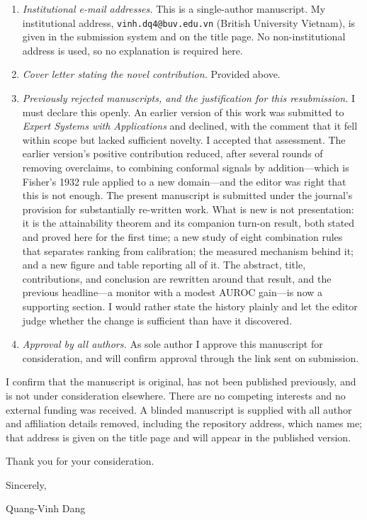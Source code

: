 \documentclass[10pt]{article}
\begin{document}
\vspace{0.3em}
\begin{enumerate}[leftmargin=1.4em,itemsep=0.2em]
\item \emph{Institutional e-mail addresses.} This is a single-author manuscript.
My institutional address, \texttt{vinh.dq4@buv.edu.vn} (British University
Vietnam), is given in the submission system and on the title page. No
non-institutional address is used, so no explanation is required here.
\item \emph{Cover letter stating the novel contribution.} Provided above.
\item \emph{Previously rejected manuscripts, and the justification for this
resubmission.} I must declare this openly. An earlier version of this work was
submitted to \emph{Expert Systems with Applications} and declined, with the comment
that it fell within scope but lacked sufficient novelty. I accepted that
assessment. The earlier version's positive contribution reduced, after several
rounds of removing overclaims, to combining conformal signals by addition---which
is Fisher's 1932 rule applied to a new domain---and the editor was right that this
is not enough. The present manuscript is submitted under the journal's provision
for substantially re-written work. What is new is not presentation: it is the
attainability theorem and its companion turn-on result, both stated and proved
here for the first time; a new study of eight combination rules that separates
ranking from calibration; the measured mechanism behind it; and a new figure and
table reporting all of it. The abstract, title, contributions, and conclusion are
rewritten around that result, and the previous headline---a monitor with a modest
AUROC gain---is now a supporting section. I would rather state the history plainly
and let the editor judge whether the change is sufficient than have it discovered.
\item \emph{Approval by all authors.} As sole author I approve this manuscript for
consideration, and will confirm approval through the link sent on submission.
\end{enumerate}

\vspace{0.3em}
I confirm that the manuscript is original, has not been published previously, and
is not under consideration elsewhere. There are no competing interests and no
external funding was received. A blinded manuscript is supplied with all author
and affiliation details removed, including the repository address, which names me;
that address is given on the title page and will appear in the published version.

\vspace{0.5em}
\noindent Thank you for your consideration.

\vspace{0.5em}
\noindent Sincerely,

\vspace{0.4em}
\noindent Quang-Vinh Dang
\end{document}
